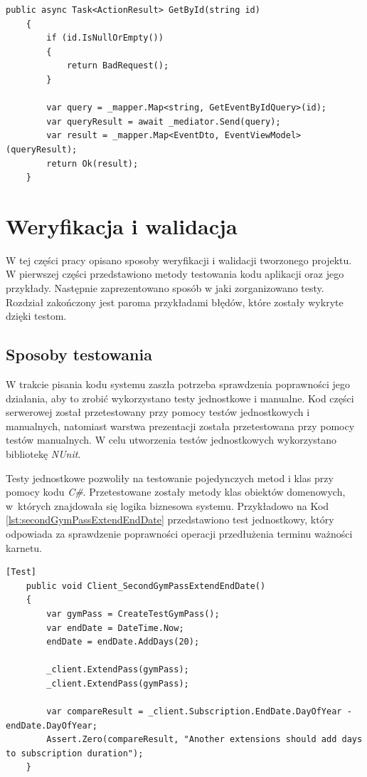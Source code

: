 \documentclass[a4paper,twoside,12pt]{book}
\begin{document}
\begin{lstlisting}[caption={Metoda \textit{GetById} klasy \textit{EventController}}, label={lst:mediator}]
	public async Task<ActionResult> GetById(string id)
	{
		if (id.IsNullOrEmpty())
		{
			return BadRequest();
		}
		
		var query = _mapper.Map<string, GetEventByIdQuery>(id);
		var queryResult = await _mediator.Send(query);
		var result = _mapper.Map<EventDto, EventViewModel>(queryResult);
		return Ok(result);
	}
\end{lstlisting}

\chapter{Weryfikacja i walidacja}
\label{chap:validation}
W tej części pracy opisano sposoby weryfikacji i walidacji tworzonego projektu. W pierwszej części przedstawiono metody testowania kodu aplikacji oraz jego przykłady. Następnie zaprezentowano sposób w jaki zorganizowano testy. Rozdział zakończony jest paroma przykładami błędów, które zostały wykryte dzięki testom.

\section{Sposoby testowania}
W trakcie pisania kodu systemu zaszła potrzeba sprawdzenia poprawności jego działania, aby to zrobić wykorzystano testy jednostkowe i manualne. Kod części serwerowej został przetestowany przy pomocy testów jednostkowych i manualnych, natomiast warstwa prezentacji została przetestowana przy pomocy testów manualnych. W celu utworzenia testów jednostkowych wykorzystano bibliotekę \textit{NUnit}.

Testy jednostkowe pozwoliły na testowanie pojedynczych metod i klas przy pomocy kodu \textit{C\#}. Przetestowane zostały metody klas obiektów domenowych, w~których znajdowała się logika biznesowa systemu. Przykładowo na Kod \ref{lst:secondGymPassExtendEndDate} przedstawiono test jednostkowy, który odpowiada za sprawdzenie poprawności operacji przedłużenia terminu ważności karnetu.
\begin{lstlisting}[caption={Przykładowy test klasy \textit{ClientUnitTest}}, label={lst:secondGymPassExtendEndDate}]
	[Test]
	public void Client_SecondGymPassExtendEndDate()
	{
		var gymPass = CreateTestGymPass();
		var endDate = DateTime.Now;
		endDate = endDate.AddDays(20);
		
		_client.ExtendPass(gymPass);
		_client.ExtendPass(gymPass);
		
		var compareResult = _client.Subscription.EndDate.DayOfYear - endDate.DayOfYear;
		Assert.Zero(compareResult, "Another extensions should add days to subscription duration");
	}
\end{lstlisting}
\end{document}
